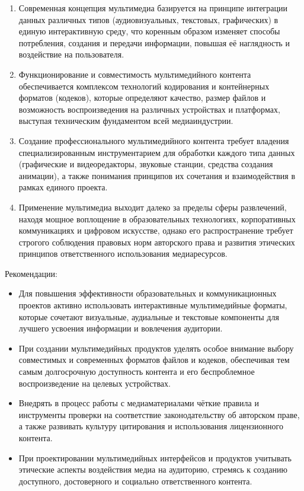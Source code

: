 \documentclass{SibFU-docs}
\begin{document}
\begin{enumerate}
    \item Современная концепция мультимедиа базируется на принципе интеграции данных различных типов (аудиовизуальных, текстовых, графических) в единую интерактивную среду, что коренным образом изменяет способы потребления, создания и передачи информации, повышая её наглядность и воздействие на пользователя.
    
    \item Функционирование и совместимость мультимедийного контента обеспечивается комплексом технологий кодирования и контейнерных форматов (кодеков), которые определяют качество, размер файлов и возможность воспроизведения на различных устройствах и платформах, выступая техническим фундаментом всей медиаиндустрии.

\item Создание профессионального мультимедийного контента требует владения специализированным инструментарием для обработки каждого типа данных (графические и видеоредакторы, звуковые станции, средства создания анимации), а также понимания принципов их сочетания и взаимодействия в рамках единого проекта.

\item Применение мультимедиа выходит далеко за пределы сферы развлечений, находя мощное воплощение в образовательных технологиях, корпоративных коммуникациях и цифровом искусстве, однако его распространение требует строгого соблюдения правовых норм авторского права и развития этических принципов ответственного использования медиаресурсов.
\end{enumerate}

Рекомендации:

\begin{itemize}[label=-]
    \item Для повышения эффективности образовательных и коммуникационных проектов активно использовать интерактивные мультимедийные форматы, которые сочетают визуальные, аудиальные и текстовые компоненты для лучшего усвоения информации и вовлечения аудитории.
    \item При создании мультимедийных продуктов уделять особое внимание выбору совместимых и современных форматов файлов и кодеков, обеспечивая тем самым долгосрочную доступность контента и его беспроблемное воспроизведение на целевых устройствах.\item Внедрять в процесс работы с медиаматериалами чёткие правила и инструменты проверки на соответствие законодательству об авторском праве, а также развивать культуру цитирования и использования лицензионного контента.\item При проектировании мультимедийных интерфейсов и продуктов учитывать этические аспекты воздействия медиа на аудиторию, стремясь к созданию доступного, достоверного и социально ответственного контента.
\end{itemize}
\end{document}
